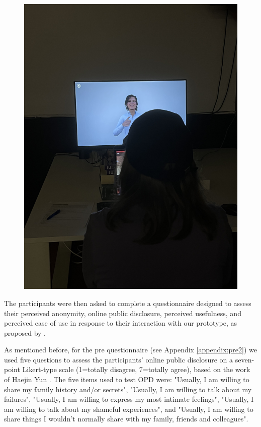\begin{figure}[!htb]
\begin{minipage}{0.49\textwidth}
        \includegraphics[width=0.9\linewidth]{figures/userTesting.jpg}
        \label{fig:userTesting}
    \end{minipage}
\end{figure}

The participants were then asked to complete a questionnaire designed to assess their perceived anonymity, online public disclosure, perceived usefulness, and perceived ease of use in response to their interaction with our prototype, as proposed by \cite{YUN06, HIT14}.

As mentioned before, for the pre questionnaire (see Appendix \ref{appendix:pre2}) we used five questions to assess the participants' online public disclosure on a seven-point Likert-type scale (1=totally disagree, 7=totally agree), based on the work of Haejin Yun \cite{YUN06}. The five items used to test OPD were: "Usually, I am willing to share my family history and/or secrets", "Usually, I am willing to talk about my failures", "Usually, I am willing to express my most intimate feelings", "Usually, I am willing to talk about my shameful experiences", and "Usually, I am willing to share things I wouldn’t normally share with my family, friends and colleagues".

